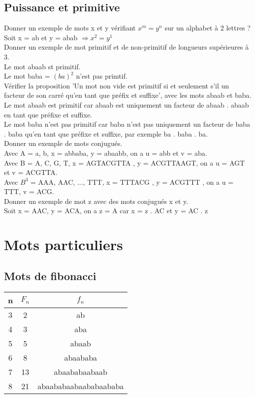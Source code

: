 \documentclass[11pt,a4paper]{article}
\begin{document}
	\subsection{Puissance et primitive}
	
	Donner un exemple de mots x et y vérifiant $x^m = y^n$ sur un alphabet à 2 lettres ?\\
	Soit x = ab et y = abab $\Rightarrow x^2 = y^1$\\
	
	Donner un exemple de mot primitif et de non-primitif de longueurs supérieures à 3.\\
	Le mot abaab st primitif.\\
	Le mot baba = $(ba)^2$ n'est pas primtif.\\
	
	Vérifier la proposition 'Un mot non vide est primitif si et seulement s'il un facteur de son carré qu'en tant que préfix et suffixe', avec les mots abaab et baba.\\
	Le mot abaab est primitif car abaab est uniquement un facteur de abaab . abaab en tant que préfixe et suffixe.\\
	Le mot baba n'est pas primitif car baba n'est pas uniquement un facteur de baba . baba qu'en tant que préfixe et suffixe, par exemple ba . baba . ba.\\
	
	Donner un exemple de mots conjugués.\\
	Avec A = {a, b}, x = abbaba, y = abaabb, on a u = abb et v = aba.\\
	Avec B = {A, C, G, T}, x = AGTACGTTA , y = ACGTTAAGT, on a u = AGT et v = ACGTTA.\\
	Avec $B^3$ = {AAA, AAC, ..., TTT}, x = TTTACG , y = ACGTTT , on a u = TTT, v = ACG.\\
	
	Donner un exemple de mot z avec des mots conjugués x et y.\\
	Soit x = AAC, y = ACA, on a z = A car x = z . AC et y = AC . z
	\newpage
	\section{Mots particuliers}
	
	\subsection{Mots de fibonacci}
	
	\begin{center}
		\begin{tabular}{|c|c|c|}
			\hline
			n & $F_n$ & $f_n$\\ 
			\hline 
			3 & 2 & ab \\ 
			\hline 
			4 & 3 & aba \\ 
			\hline 
			5 & 5 & abaab \\ 
			\hline 
			6 & 8 & abaababa \\ 
			\hline 
			7 & 13 & abaababaabaab \\ 
			\hline 
			8 & 21 & abaababaabaababaababa \\ 
			\hline 
		\end{tabular} 
	\end{center}
\end{document}
